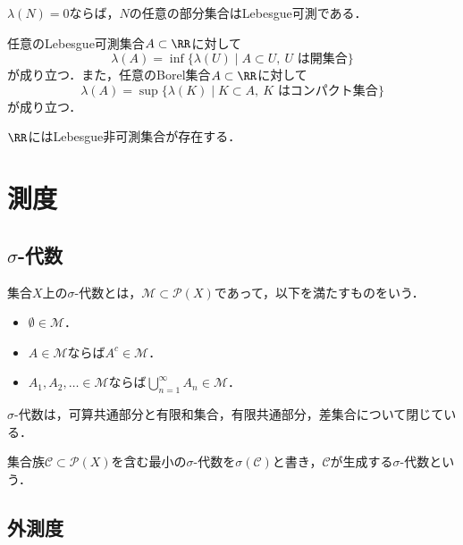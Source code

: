 \begin{theorem}
    $\lambda(N)=0$ならば，$N$の任意の部分集合はLebesgue可測である．
\end{theorem}

\begin{theorem}
    任意のLebesgue可測集合$A \subset \RR$に対して
    \[
    \lambda(A) = \inf\{\lambda(U) \mid A \subset U,\ U \text{ は開集合}\}
    \]
    が成り立つ．また，任意のBorel集合$A \subset \RR$に対して
    \[
    \lambda(A) = \sup\{\lambda(K) \mid K \subset A,\ K \text{ はコンパクト集合}\}
    \]
    が成り立つ．
\end{theorem}

\begin{theorem}
    $\RR$にはLebesgue非可測集合が存在する．
\end{theorem}

\section{測度}

\subsection{$\sigma$-代数}

\begin{definition}
    集合$X$上の$\sigma$-代数とは，$\mathcal M \subset \mathcal P(X)$であって，以下を満たすものをいう．
    \begin{itemize}
        \item $\emptyset \in \mathcal M$．
        \item $A \in \mathcal M$ならば$A^c \in \mathcal M$．
        \item $A_1,A_2,\dots \in \mathcal M$ならば$\bigcup_{n=1}^{\infty} A_n \in \mathcal M$．
    \end{itemize}
\end{definition}

\begin{proposition}
    $\sigma$-代数は，可算共通部分と有限和集合，有限共通部分，差集合について閉じている．
\end{proposition}

\begin{definition}
    集合族$\mathcal C \subset \mathcal P(X)$を含む最小の$\sigma$-代数を$\sigma(\mathcal C)$と書き，$\mathcal C$が生成する$\sigma$-代数という．
\end{definition}

\subsection{外測度}

